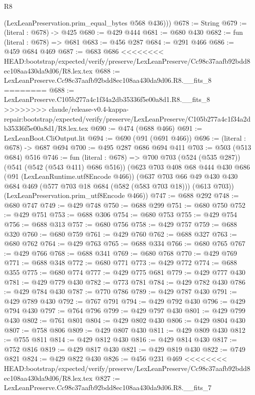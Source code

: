 \begin{lexlean}{R8}
\begin{coremodule}
{{{{{{{{{{{{{{{{{        (LexLeanPreservation.prim_equal_bytes @568 @436)))
@678 := String
@679 := (literal : @678) -> @425
@680 := @429 @444
@681 := @680 @430
@682 := fun (literal : @678) => @681
@683 := @456 @287
@684 := @291 @466
@686 := @459 @684 @469
@687 := @683 @686
<<<<<<<< HEAD:bootstrap/expected/verify/preserve/LexLeanPreserve/Cc98c37aafb92bdd8ec108aa430da9d06/R8.lex.tex
@688 := LexLeanPreserve.Cc98c37aafb92bdd8ec108aa430da9d06.R8.__fits_8
========
@688 := LexLeanPreserve.C105b277a4c1f34a2db35336f5e00a8d1.R8.__fits_8
>>>>>>>> claude/release-v0.4-kappa-repair:bootstrap/expected/verify/preserve/LexLeanPreserve/C105b277a4c1f34a2db35336f5e00a8d1/R8.lex.tex
@690 := @474 (@688 @466)
@691 := LexLeanBoot.CliOutput.lit
@694 := @690 (@91 (@691 @466))
@696 := (literal : @678) -> @687 @694
@700 := @495 @287 @686 @694 @411
@703 := @503 (@513 @684) @516
@746 := fun (literal : @678) =>
  @700
    @703
    (@524 (@535 @287))
    (@541 (@542 (@543 @411) @686 @516))
    (@623
      @703
      @408
      @68
      @444
      @430
      @686
      (@91 (LexLeanRuntime.utf8Encode @466))
      (@637
        @703
        @66
        @49
        @430
        @430
        @684
        @469
        (@577 @703 @18 @684 (@582 (@583 @703 @18)))
        (@613 @703))
      (LexLeanPreservation.prim_utf8Encode @466))
@747 := @688 @292
@748 := @680 @747
@749 := @429 @748
@750 := @688 @299
@751 := @680 @750
@752 := @429 @751
@753 := @688 @306
@754 := @680 @753
@755 := @429 @754
@756 := @688 @313
@757 := @680 @756
@758 := @429 @757
@759 := @688 @320
@760 := @680 @759
@761 := @429 @760
@762 := @688 @327
@763 := @680 @762
@764 := @429 @763
@765 := @688 @334
@766 := @680 @765
@767 := @429 @766
@768 := @688 @341
@769 := @680 @768
@770 := @429 @769
@771 := @688 @348
@772 := @680 @771
@773 := @429 @772
@774 := @688 @355
@775 := @680 @774
@777 := @429 @775 @681
@779 := @429 @777 @430
@781 := @429 @779 @430
@782 := @773 @781
@784 := @429 @782 @430
@786 := @429 @784 @430
@787 := @770 @786
@789 := @429 @787 @430
@791 := @429 @789 @430
@792 := @767 @791
@794 := @429 @792 @430
@796 := @429 @794 @430
@797 := @764 @796
@799 := @429 @797 @430
@801 := @429 @799 @430
@802 := @761 @801
@804 := @429 @802 @430
@806 := @429 @804 @430
@807 := @758 @806
@809 := @429 @807 @430
@811 := @429 @809 @430
@812 := @755 @811
@814 := @429 @812 @430
@816 := @429 @814 @430
@817 := @752 @816
@819 := @429 @817 @430
@821 := @429 @819 @430
@822 := @749 @821
@824 := @429 @822 @430
@826 := @456 @231 @469
<<<<<<<< HEAD:bootstrap/expected/verify/preserve/LexLeanPreserve/Cc98c37aafb92bdd8ec108aa430da9d06/R8.lex.tex
@827 := LexLeanPreserve.Cc98c37aafb92bdd8ec108aa430da9d06.R8.__fits_7
}}}}}}}}}}}}}}}}}
\end{coremodule}
\end{lexlean}
